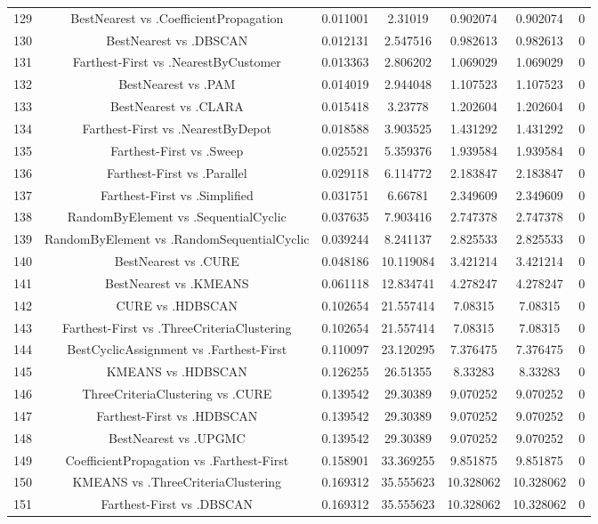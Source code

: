 \documentclass[a4paper,10pt]{article}
\begin{document}
\begin{landscape}
\begin{table}[!htp]
\begin{tabular}{ccccccc}
129&BestNearest vs .CoefficientPropagation&0.011001&2.31019&0.902074&0.902074&0\\
130&BestNearest vs .DBSCAN&0.012131&2.547516&0.982613&0.982613&0\\
131&Farthest-First vs .NearestByCustomer&0.013363&2.806202&1.069029&1.069029&0\\
132&BestNearest vs .PAM&0.014019&2.944048&1.107523&1.107523&0\\
133&BestNearest vs .CLARA&0.015418&3.23778&1.202604&1.202604&0\\
134&Farthest-First vs .NearestByDepot&0.018588&3.903525&1.431292&1.431292&0\\
135&Farthest-First vs .Sweep&0.025521&5.359376&1.939584&1.939584&0\\
136&Farthest-First vs .Parallel&0.029118&6.114772&2.183847&2.183847&0\\
137&Farthest-First vs .Simplified&0.031751&6.66781&2.349609&2.349609&0\\
138&RandomByElement vs .SequentialCyclic&0.037635&7.903416&2.747378&2.747378&0\\
139&RandomByElement vs .RandomSequentialCyclic&0.039244&8.241137&2.825533&2.825533&0\\
140&BestNearest vs .CURE&0.048186&10.119084&3.421214&3.421214&0\\
141&BestNearest vs .KMEANS&0.061118&12.834741&4.278247&4.278247&0\\
142&CURE vs .HDBSCAN&0.102654&21.557414&7.08315&7.08315&0\\
143&Farthest-First vs .ThreeCriteriaClustering&0.102654&21.557414&7.08315&7.08315&0\\
144&BestCyclicAssignment vs .Farthest-First&0.110097&23.120295&7.376475&7.376475&0\\
145&KMEANS vs .HDBSCAN&0.126255&26.51355&8.33283&8.33283&0\\
146&ThreeCriteriaClustering vs .CURE&0.139542&29.30389&9.070252&9.070252&0\\
147&Farthest-First vs .HDBSCAN&0.139542&29.30389&9.070252&9.070252&0\\
148&BestNearest vs .UPGMC&0.139542&29.30389&9.070252&9.070252&0\\
149&CoefficientPropagation vs .Farthest-First&0.158901&33.369255&9.851875&9.851875&0\\
150&KMEANS vs .ThreeCriteriaClustering&0.169312&35.555623&10.328062&10.328062&0\\
151&Farthest-First vs .DBSCAN&0.169312&35.555623&10.328062&10.328062&0\\

\end{tabular}
\end{table}
\end{landscape}
\end{document}
